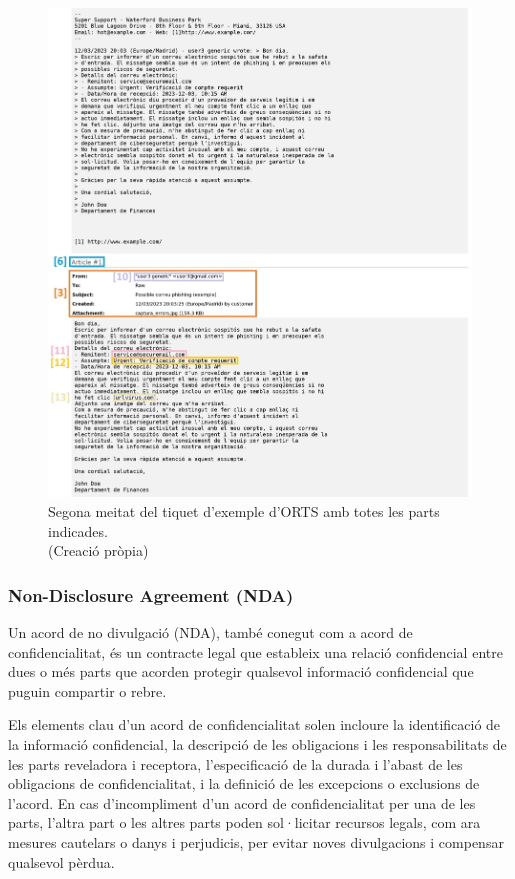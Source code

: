 \begin{figure}[H]
    \centering
    \includegraphics[width=\textwidth]{meitat-2.png}
    \caption{Segona meitat del tiquet d'exemple d'ORTS amb totes les parts indicades. \\ (Creació pròpia)}
    \label{fig:tiquet-exemple-2}
\end{figure}


\subsubsection{Non-Disclosure Agreement (NDA)}
Un acord de no divulgació (NDA), també conegut com a acord de confidencialitat, és un contracte legal que estableix una relació confidencial entre dues o més parts que acorden protegir qualsevol informació confidencial que puguin compartir o rebre.

Els elements clau d'un acord de confidencialitat solen incloure la identificació de la informació confidencial, la descripció de les obligacions i les responsabilitats de les parts reveladora i receptora, l'especificació de la durada i l'abast de les obligacions de confidencialitat, i la definició de les excepcions o exclusions de l'acord. En cas d'incompliment d'un acord de confidencialitat per una de les parts, l'altra part o les altres parts poden sol·licitar recursos legals, com ara mesures cautelars o danys i perjudicis, per evitar noves divulgacions i compensar qualsevol pèrdua.

